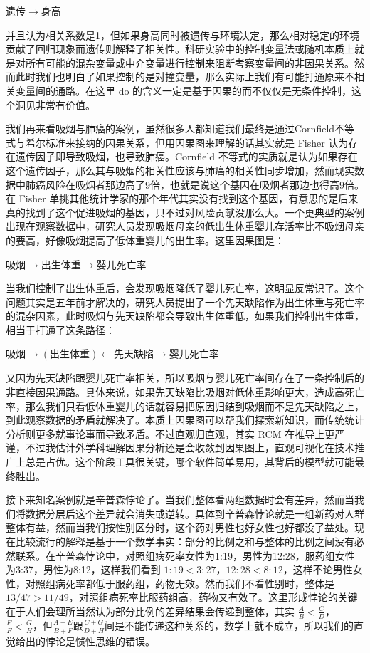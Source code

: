 \documentclass[]{tufte-book}
\begin{document}
\(遗传 \rightarrow 身高\)

并且认为相关系数是1，但如果身高同时被遗传与环境决定，那么相对稳定的环境贡献了回归现象而遗传则解释了相关性。科研实验中的控制变量法或随机本质上就是对所有可能的混杂变量或中介变量进行控制来阻断考察变量间的非因果关系。然而此时我们也明白了如果控制的是对撞变量，那么实际上我们有可能打通原来不相关变量间的通路。在这里 do 的含义一定是基于因果的而不仅仅是无条件控制，这个洞见非常有价值。

我们再来看吸烟与肺癌的案例，虽然很多人都知道我们最终是通过Cornfield不等式与希尔标准来接纳的因果关系，但用因果图来理解的话其实就是 Fisher 认为存在遗传因子即导致吸烟，也导致肺癌。Cornfield 不等式的实质就是认为如果存在这个遗传因子，那么其与吸烟的相关性应该与肺癌的相关性同步增加，然而现实数据中肺癌风险在吸烟者那边高了9倍，也就是说这个基因在吸烟者那边也得高9倍。在 Fisher 单挑其他统计学家的那个年代其实没有找到这个基因，有意思的是后来真的找到了这个促进吸烟的基因，只不过对风险贡献没那么大。一个更典型的案例出现在观察数据中，研究人员发现吸烟母亲的低出生体重婴儿存活率比不吸烟母亲的要高，好像吸烟提高了低体重婴儿的出生率。这里因果图是：

\(吸烟 \rightarrow 出生体重 \rightarrow 婴儿死亡率\)

当我们控制了出生体重后，会发现吸烟降低了婴儿死亡率，这明显反常识了。这个问题其实是五年前才解决的，研究人员提出了一个先天缺陷作为出生体重与死亡率的混杂因素，此时吸烟与先天缺陷都会导致出生体重低，如果我们控制出生体重，相当于打通了这条路径：

\(吸烟 \rightarrow (出生体重) \leftarrow 先天缺陷 \rightarrow 婴儿死亡率\)

又因为先天缺陷跟婴儿死亡率相关，所以吸烟与婴儿死亡率间存在了一条控制后的非直接因果通路。具体来说，如果先天缺陷比吸烟对低体重影响更大，造成高死亡率，那么我们只看低体重婴儿的话就容易把原因归结到吸烟而不是先天缺陷之上，到此观察数据的矛盾就解决了。本质上因果图可以帮我们探索新知识，而传统统计分析则更多就事论事而导致矛盾。不过直观归直观，其实 RCM 在推导上更严谨，不过我估计外学科理解因果分析还是会收敛到因果图上，直观可视化在技术推广上总是占优。这个阶段工具很关键，哪个软件简单易用，其背后的模型就可能最终胜出。

接下来知名案例就是辛普森悖论了。当我们整体看两组数据时会有差异，然而当我们将数据分层后这个差异就会消失或逆转。具体到辛普森悖论就是一组新药对人群整体有益，然而当我们按性别区分时，这个药对男性也好女性也好都没了益处。现在比较流行的解释是基于一个数学事实：部分的比例之和与整体的比例之间没有必然联系。在辛普森悖论中，对照组病死率女性为1:19，男性为12:28，服药组女性为3:37，男性为8:12，这样我们看到 \(1:19 < 3:27\)，\(12:28 < 8:12\)，这样不论男性女性，对照组病死率都低于服药组，药物无效。然而我们不看性别时，整体是\(13/47>11/49\)，对照组病死率比服药组高，药物又有效了。这里形成悖论的关键在于人们会理所当然认为部分比例的差异结果会传递到整体，其实 \(\frac{A}{B}<\frac{C}{D}\)， \(\frac{E}{F}<\frac{G}{H}\)，但\(\frac{A+E}{B+F}\)跟\(\frac{C+G}{D+H}\)间是不能传递这种关系的，数学上就不成立，所以我们的直觉给出的悖论是惯性思维的错误。
\end{document}
